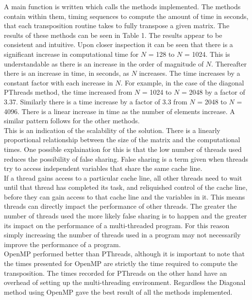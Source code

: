 \documentclass[a4paper, 11pt, onecolumn, conference]{IEEEtran}      %
\begin{document}
A main function is written which calls the methods implemented. The methods contain within them, timing sequences to compute the amount of time in seconds, that each transposition routine takes to fully transpose a given matrix. The results of these methods can be seen in Table 1. The results appear to be consistent and intuitive. Upon closer inspection it can be seen that there is a significant increase in computational time for $N$ = 128 to $N$ = 1024. This is understandable as there is an increase in the order of magnitude of $N$. Thereafter there is an increase in time, in seconds, as $N$ increases. The time increases by a constant factor with each increase in $N$. For example, in the case of the diagonal PThreads method, the time increased from $N$ = 1024 to $N$ = 2048 by a factor of 3.37. Similarly there is a time increase by a factor of 3.3 from $N$ = 2048 to $N$ = 4096. There is a linear increase in time as the number of elements increase. A similar pattern follows for the other methods.\\

This is an indication of the scalability of the solution. There is a linearly proportional relationship between the size of the matrix and the computational times. One possible explaination for this is that the low number of threads used reduces the possibility of false sharing. False sharing is a term given when threads try to access independent variables that share the same cache line\cite{thompson_2011}.\\

If a thread gains access to a particular cache line, all other threads need to wait until that thread has completed its task, and reliquished control of the cache line, before they can gain access to that cache line and the variables in it. This means threads can directly impact the performance of other threads. The greater the number of threads used the more likely false sharing is to happen and the greater its impact on the performance of a multi-threaded program. For this reason simply increasing the number of threads used in a program may not necessarily improve the performance of a program.\\

OpenMP performed better than PThreads, although it is important to note that the times presented for OpenMP are strictly the time required to compute the transposition. The times recorded for PThreads on the other hand have an overhead of setting up the multi-threading environment. Regardless the Diagonal method using OpenMP gave the best result of all the methods implemented.
\end{document}
